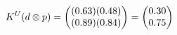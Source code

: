 \documentclass[preview]{standalone}
\begin{document}
\begin{align*}
\special{dvisvgm:raw <g id='unique000'>}K^U(d \otimes p) = \begin{pmatrix} (0.63)(0.48) \\ (0.89)(0.84) \end{pmatrix} = \begin{pmatrix} 0.30 \\ 0.75 \end{pmatrix}\special{dvisvgm:raw </g>}
\end{align*}
\end{document}
